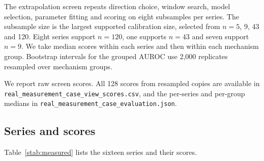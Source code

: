 \documentclass{article}
\begin{document}
The extrapolation screen repeats direction choice, window search, model selection, parameter fitting and scoring on eight subsamples per series. The subsample size is the largest supported calibration size, selected from $n = 5$, 9, 43 and 120. Eight series support $n = 120$, one supports $n = 43$ and seven support $n = 9$. We take median scores within each series and then within each mechanism group. Bootstrap intervals for the grouped AUROC use 2,000 replicates resampled over mechanism groups.

We report raw screen scores. All 128 scores from resampled copies are available in \nolinkurl{real_measurement_case_view_scores.csv}, and the per-series and per-group medians in \nolinkurl{real_measurement_case_evaluation.json}.

\subsection{Series and scores}

Table~\ref{stab:measured} lists the sixteen series and their scores.
\end{document}
